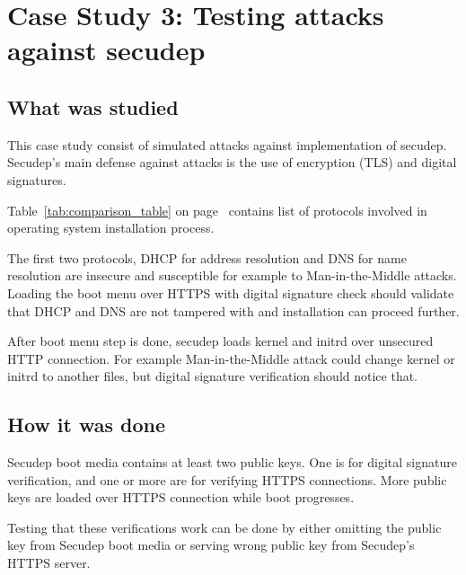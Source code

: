 \section{Case Study 3: Testing attacks against secudep}
\label{sec:casestudy3}

\subsection{What was studied}

This case study consist of simulated attacks against implementation of
secudep. Secudep's main defense against attacks is the use of
encryption (TLS) and digital signatures.

Table~\ref{tab:comparison_table} on
page~\pageref{tab:comparison_table} contains list of protocols
involved in operating system installation process.

The first two protocols, DHCP for address resolution and DNS for name
resolution are insecure and susceptible for example to
Man-in-the-Middle attacks. Loading the boot menu over HTTPS with
digital signature check should validate that DHCP and DNS are not
tampered with and installation can proceed further.

After boot menu step is done, secudep loads kernel and initrd over
unsecured HTTP connection. For example Man-in-the-Middle attack could
change kernel or initrd to another files, but digital signature
verification should notice that.


\subsection{How it was done}

Secudep boot media contains at least two public keys. One is for
digital signature verification, and one or more are for verifying
HTTPS connections. More public keys are loaded over HTTPS connection
while boot progresses.

Testing that these verifications work can be done by either omitting
the public key from Secudep boot media or serving wrong public key
from Secudep's HTTPS server.

